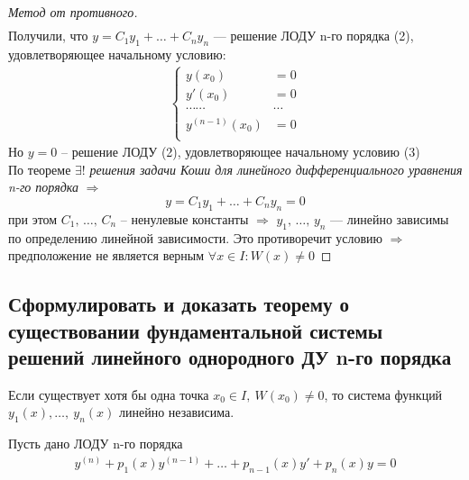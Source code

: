 \begin{proof}[Метод от противного]
\begin{align*}
    \end{align*}
    Получили, что $y = C_1y_1 + \ldots + C_ny_n$ --- решение ЛОДУ n-го порядка (2), удовлетворяющее начальному условию:
    \begin{gather*}
        \left\{ \begin{aligned}
            y(x_0) &= 0 \\
            y'(x_0) &= 0 \\
            \cdots\cdots&\cdots \\
            y^{(n-1)}(x_0) &= 0 \\
        \end{aligned}\right.
    \end{gather*}
    Но $y=0$ -- решение ЛОДУ (2), удовлетворяющее начальному условию (3) \\
    По теореме $\exists!$ \textit{решения задачи Коши для линейного дифференциального уравнения n-го порядка} $\Rightarrow$
    \[
        y = C_1y_1 + \ldots + C_ny_n = 0
    \]
    при этом $C_1,\, \ldots,\, C_n$ -- ненулевые константы $\Rightarrow$ $y_1,\, \ldots,\, y_n$ --- линейно зависимы по определению линейной зависимости.
    Это противоречит условию $\Rightarrow$ предположение не является верным $\forall x \in I\colon W(x) \ne 0$
\end{proof}

\subsection{Сформулировать и доказать теорему о существовании фундаментальной системы решений линейного однородного ДУ n-го порядка}

\begin{assertion*}
    Если существует хотя бы одна точка $x_0 \in I,\ W(x_0) \ne 0$, то система функций \break$y_1(x), \ldots,\ y_n(x)$ линейно независима.    
\end{assertion*}
Пусть дано ЛОДУ n-го порядка
\begin{align*}
    y^{(n)} + p_1(x) y^{(n-1)} + \ldots + p_{n-1}(x)y' + p_n(x)y = 0 \tag{1}
\end{align*}

